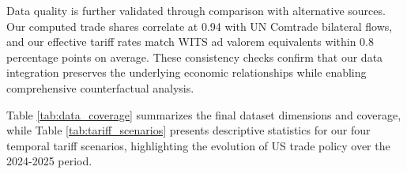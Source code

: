Data quality is further validated through comparison with alternative sources. Our computed trade shares correlate at 0.94 with UN Comtrade bilateral flows, and our effective tariff rates match WITS ad valorem equivalents within 0.8 percentage points on average. These consistency checks confirm that our data integration preserves the underlying economic relationships while enabling comprehensive counterfactual analysis.

Table \ref{tab:data_coverage} summarizes the final dataset dimensions and coverage, while Table \ref{tab:tariff_scenarios} presents descriptive statistics for our four temporal tariff scenarios, highlighting the evolution of US trade policy over the 2024-2025 period.



